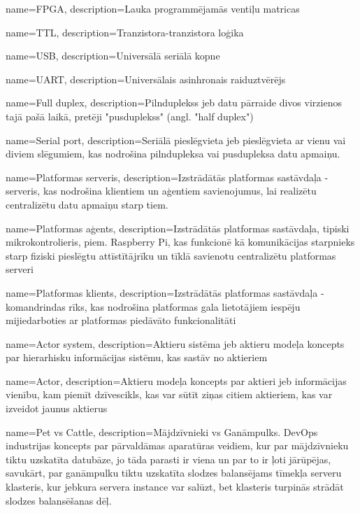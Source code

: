 \makeglossaries

{
    name=FPGA,
    description={Lauka programmējamās ventiļu matricas}
}

{
    name=TTL,
    description={Tranzistora-tranzistora loģika}
}

{
    name=USB,
    description={Universālā seriālā kopne}
}

{
    name=UART,
    description={Universālais asinhronais raiduztvērējs}
}

{
    name=Full duplex,
    description={Pilnduplekss jeb datu pārraide divos virzienos tajā pašā laikā, pretēji "pusduplekss" (angl. "half duplex")}
}

{
    name=Serial port,
    description={Seriālā pieslēgvieta jeb pieslēgvieta ar vienu vai diviem slēgumiem, kas nodrošina pilndupleksa 
        vai pusdupleksa datu apmaiņu.}
}

{
    name=Platformas serveris,
    description={Izstrādātās platformas sastāvdaļa - serveris, kas nodrošina klientiem un aģentiem savienojumus, 
        lai realizētu centralizētu datu apmaiņu starp tiem.}
}

{
    name=Platformas aģents,
    description={Izstrādātās platformas sastāvdaļa, tipiski mikrokontrolieris, piem. Raspberry Pi, kas 
        funkcionē kā komunikācijas starpnieks starp fiziski pieslēgtu attīstītājrīku un tīklā 
        savienotu centralizētu platformas serveri}
}

{
    name=Platformas klients,
    description={Izstrādātās platformas sastāvdaļa - komandrindas rīks, kas nodrošina platformas gala lietotājiem
        iespēju mijiedarboties ar platformas piedāvāto funkcionalitāti}
}

{
    name=Actor system,
    description={Aktieru sistēma jeb aktieru modeļa koncepts par hierarhisku informācijas sistēmu, kas sastāv no aktieriem}
}

{
    name=Actor,
    description={Aktieru modeļa koncepts par aktieri jeb informācijas vienību, kam piemīt dzīvescikls, 
        kas var sūtīt ziņas citiem aktieriem, kas var izveidot jaunus aktierus}
}

{
    name=Pet vs Cattle,
    description={Mājdzīvnieki vs Ganāmpulks. DevOps industrijas koncepts par pārvaldāmas aparatūras veidiem, kur
        par mājdzīvnieku tiktu uzskatīta datubāze, jo tāda parasti ir viena un par to ir ļoti jārūpējas, savukārt,
        par ganāmpulku tiktu uzskatīta slodzes balansējams tīmekļa serveru klasteris, kur jebkura servera instance
        var salūzt, bet klasteris turpinās strādāt slodzes balansēšanas dēļ.}
}